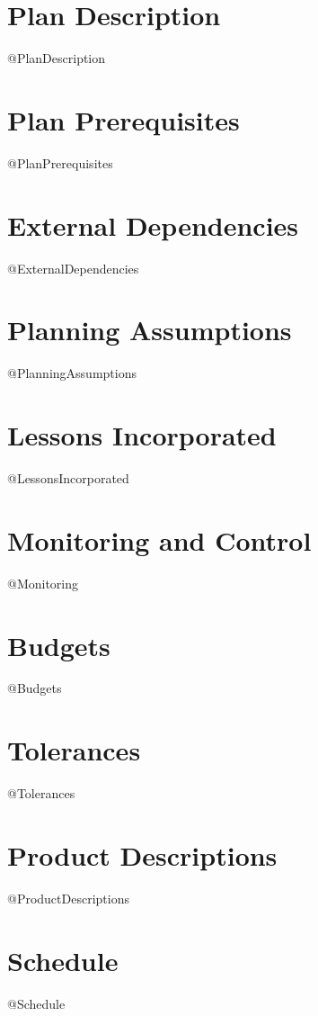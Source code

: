 \documentclass{report}
\begin{document}
\princeplan
{}
\date{\today}
\author{@Author}

\maketitle

\tableofcontents

\newpage
\section{Plan Description} 
@PlanDescription

\section{Plan Prerequisites}
@PlanPrerequisites

\section{External Dependencies}
@ExternalDependencies

\section{Planning Assumptions}
@PlanningAssumptions

\section{Lessons Incorporated}
@LessonsIncorporated

\section{Monitoring and Control}
@Monitoring

\section{Budgets}
@Budgets

\section{Tolerances}
@Tolerances

\section{Product Descriptions}
@ProductDescriptions

\section{Schedule}
@Schedule
\end{document}

